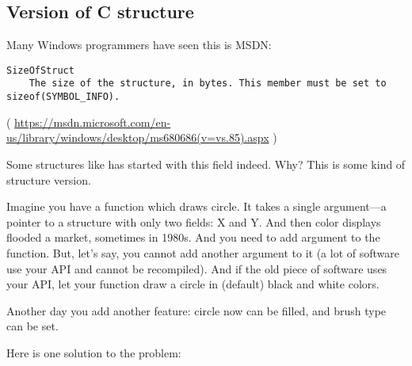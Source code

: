 \subsection{Version of C structure}

Many Windows programmers have seen this is MSDN:

\begin{lstlisting}
SizeOfStruct
    The size of the structure, in bytes. This member must be set to sizeof(SYMBOL_INFO).
\end{lstlisting}

( \url{https://msdn.microsoft.com/en-us/library/windows/desktop/ms680686(v=vs.85).aspx} )

Some structures like  has started with this field indeed. Why?
This is some kind of structure version.

Imagine you have a function which draws circle.
It takes a single argument---a pointer to a structure with only two fields: X and Y.
And then color displays flooded a market, sometimes in 1980s. And you need to add  argument to the function.
But, let's say, you cannot add another argument to it (a lot of software use your \ac{API} and cannot be recompiled).
And if the old piece of software uses your \ac{API}, let your function draw a circle in (default) black and white colors.

Another day you add another feature: circle now can be filled, and brush type can be set.

Here is one solution to the problem:

